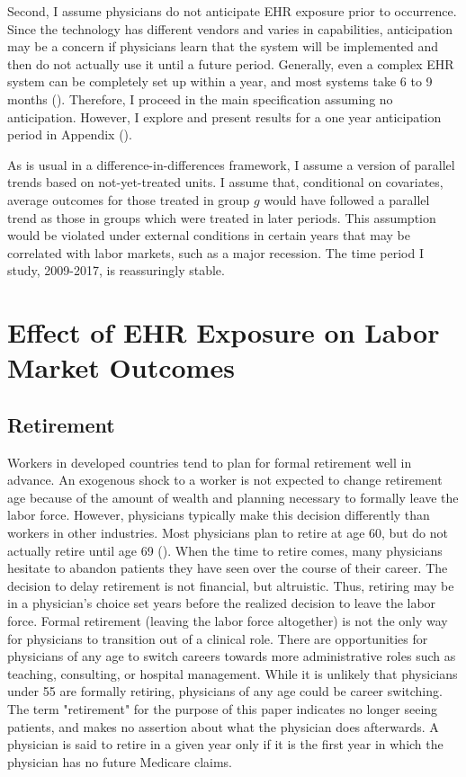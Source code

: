 \documentclass[11pt]{article}
\begin{document}
Second, I assume physicians do not anticipate EHR exposure prior to occurrence. Since the technology has different vendors and varies in capabilities, anticipation may be a concern if physicians learn that the system will be implemented and then do not actually use it until a future period. Generally, even a complex EHR system can be completely set up within a year, and most systems take 6 to 9 months (\cite{uzialko_2021}). Therefore, I proceed in the main specification assuming no anticipation. However, I explore and present results for a one year anticipation period in Appendix (). 

As is usual in a difference-in-differences framework, I assume a version of parallel trends based on not-yet-treated units. I assume that, conditional on covariates, average outcomes for those treated in group $g$ would have followed a parallel trend as those in groups which were treated in later periods. This assumption would be violated under external conditions in certain years that may be correlated with labor markets, such as a major recession. The time period I study, 2009-2017, is reassuringly stable.







\section{Effect of EHR Exposure on Labor Market Outcomes}

\subsection{Retirement}

Workers in developed countries tend to plan for formal retirement well in advance. An exogenous shock to a worker is not expected to change retirement age because of the amount of wealth and planning necessary to formally leave the labor force. However, physicians typically make this decision differently than workers in other industries. Most physicians plan to retire at age 60, but do not actually retire until age 69 (\cite{collier2017challenges}). When the time to retire comes, many physicians hesitate to abandon patients they have seen over the course of their career. The decision to delay retirement is not financial, but altruistic. Thus, retiring may be in a physician's choice set years before the realized decision to leave the labor force. Formal retirement (leaving the labor force altogether) is not the only way for physicians to transition out of a clinical role. There are opportunities for physicians of any age to switch careers towards more administrative roles such as teaching, consulting, or hospital management. While it is unlikely that physicians under 55 are formally retiring, physicians of any age could be career switching. The term "retirement" for the purpose of this paper indicates no longer seeing patients, and makes no assertion about what the physician does afterwards. A physician is said to retire in a given year only if it is the first year in which the physician has no future Medicare claims.
\end{document}
